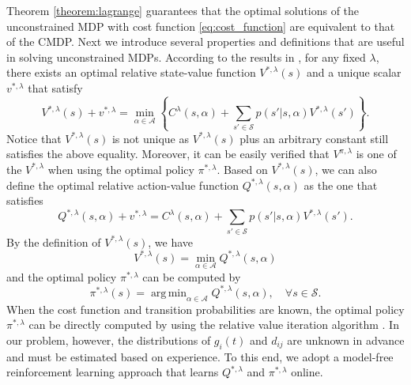 \documentclass[lettersize, journal]{IEEEtran}
\DeclareMathOperator*{\argmin}{arg\,min}
\begin{document}
Theorem \ref{theorem:lagrange} 
guarantees that the optimal solutions of the unconstrained MDP with cost function \eqref{eq:cost_function}
are equivalent to that of the CMDP.
Next we introduce several properties and definitions that are useful in solving unconstrained MDPs.
According to the results in \cite{bertsekas2000dynamic}, for any fixed $\lambda$, 
there exists an optimal relative state-value function $V^{*, \lambda}(s)$ and a unique scalar $v^{*,\lambda}$ that satisfy
\begin{equation*}
    V^{*, \lambda}(s) + v^{*,\lambda} = \min_{\alpha\in\mathcal{A}} \left\{ C^{\lambda}(s, \alpha) + \sum_{s'\in\mathcal{S}} p(s'|s,\alpha) V^{*, \lambda}(s') \right\}.
\end{equation*}
Notice that $V^{*,\lambda}(s)$ is not unique as $V^{*,\lambda}(s)$ plus an arbitrary constant still satisfies the above equality.
Moreover, it can be easily verified that $V^{\pi,\lambda}$ is one of the $V^{*,\lambda}$ when using the optimal policy $\pi^{*, \lambda}$.
Based on $V^{*, \lambda}(s)$, we can also define the optimal relative action-value function $Q^{*, \lambda}(s, \alpha)$ as the one that satisfies
\begin{equation*}
    Q^{*, \lambda}(s, \alpha) + v^{*,\lambda} = C^{\lambda}(s, \alpha) + \sum_{s'\in\mathcal{S}} p(s'|s,\alpha) V^{*, \lambda}(s').
\end{equation*}
By the definition of $V^{*, \lambda}(s)$, we have 
\begin{equation}
    V^{*, \lambda}(s) = \min_{\alpha\in\mathcal{A}} Q^{*, \lambda}(s, \alpha)
    \label{eq:V_Q}
\end{equation}
and the optimal policy $\pi^{*, \lambda}$ can be computed by
\begin{equation}
    \pi^{*, \lambda}(s) = \argmin_{\alpha\in\mathcal{A}} Q^{*, \lambda}(s, \alpha), \quad \forall s\in\mathcal{S}.
    \label{eq:optimal_policy}
\end{equation}
When the cost function and transition probabilities are known, the optimal policy $\pi^{*, \lambda}$ can be directly computed by using the relative value iteration algorithm \cite{sutton2018reinforcement}.
In our problem, however, the distributions of $g_i(t)$ and $d_{ij}$ are unknown in advance and must be estimated based on experience.
To this end, we adopt a model-free reinforcement learning approach that learns $Q^{*, \lambda}$ and $\pi^{*, \lambda}$ online.
\end{document}

